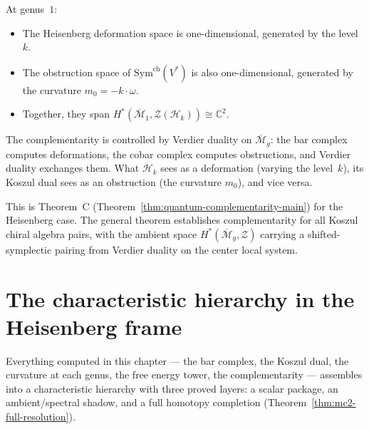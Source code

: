 At genus~$1$:
\begin{itemize}
\item The Heisenberg deformation space is one-dimensional,
  generated by the level~$k$.
\item The obstruction space of $\mathrm{Sym}^{\mathrm{ch}}(V^*)$
  is also one-dimensional, generated by the curvature
  $m_0 = -k \cdot \omega$.
\item Together, they span $H^*(\overline{\mathcal{M}}_1,
  \mathcal{Z}(\mathcal{H}_k)) \cong \mathbb{C}^2$.
\end{itemize}

The complementarity is controlled by Verdier duality on
$\overline{\mathcal{M}}_g$: the bar complex computes
deformations, the cobar complex computes obstructions,
and Verdier duality exchanges them.  What $\mathcal{H}_k$ sees
as a deformation (varying the level~$k$), its Koszul dual
sees as an obstruction (the curvature $m_0$), and vice versa.

This is Theorem~C
(Theorem~\ref{thm:quantum-complementarity-main})
for the Heisenberg case.  The general theorem establishes
complementarity for all Koszul chiral algebra pairs, with the
ambient space $H^*(\overline{\mathcal{M}}_g, \mathcal{Z})$
carrying a shifted-symplectic pairing from Verdier duality on
the center local system.

\section{The characteristic hierarchy in the Heisenberg frame}
\label{sec:frame-modular-package}

Everything computed in this chapter --- the bar complex,
the Koszul dual, the curvature at each genus, the free energy
tower, the complementarity --- assembles into a characteristic
hierarchy with three proved layers: a scalar package, an
ambient/spectral shadow, and a full homotopy completion
(Theorem~\ref{thm:mc2-full-resolution}).

